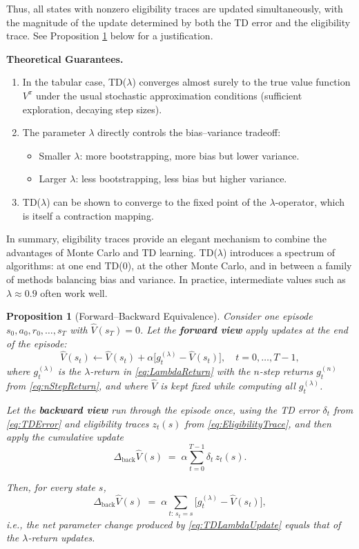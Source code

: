 \documentclass[
]{book}
\newtheorem{proposition}{Proposition}[chapter]
\theoremstyle{definition}
\theoremstyle{definition}
\theoremstyle{definition}
\theoremstyle{definition}
\theoremstyle{remark}
\begin{document}
Thus, all states with nonzero eligibility traces are updated simultaneously, with the magnitude of the update determined by both the TD error and the eligibility trace. See Proposition \ref{prp:ForwardBackwardEquivalence} below for a justification.

\textbf{Theoretical Guarantees.}

\begin{enumerate}
\def\labelenumi{\arabic{enumi}.}
\item
  In the tabular case, TD(\(\lambda\)) converges almost surely to the true value function \(V^\pi\) under the usual stochastic approximation conditions (sufficient exploration, decaying step sizes).
\item
  The parameter \(\lambda\) directly controls the bias--variance tradeoff:

  \begin{itemize}
  \item
    Smaller \(\lambda\): more bootstrapping, more bias but lower variance.
  \item
    Larger \(\lambda\): less bootstrapping, less bias but higher variance.
  \end{itemize}
\item
  TD(\(\lambda\)) can be shown to converge to the fixed point of the \(\lambda\)-operator, which is itself a contraction mapping.
\end{enumerate}

In summary, eligibility traces provide an elegant mechanism to combine the advantages of Monte Carlo and TD learning. TD(\(\lambda\)) introduces a spectrum of algorithms: at one end TD(0), at the other Monte Carlo, and in between a family of methods balancing bias and variance. In practice, intermediate values such as \(\lambda \approx 0.9\) often work well.

\begin{proposition}[Forward–Backward Equivalence]
\protect\hypertarget{prp:ForwardBackwardEquivalence}{}\label{prp:ForwardBackwardEquivalence}Consider one episode \(s_0,a_0,r_0,\ldots,s_T\) with \(\hat V(s_T)=0\). Let the \textbf{forward view} apply updates at the end of the episode:
\[
\hat V(s_t) \leftarrow \hat V(s_t) + \alpha \big[g_t^{(\lambda)}-\hat V(s_t)\big],
\quad t=0,\ldots,T-1,
\]
where \(g_t^{(\lambda)}\) is the \(\lambda\)-return in \eqref{eq:LambdaReturn} with the \(n\)-step returns \(g_t^{(n)}\) from \eqref{eq:nStepReturn}, and where \(\hat V\) is kept fixed while computing all \(g_t^{(\lambda)}\).

Let the \textbf{backward view} run through the episode once, using the TD error \(\delta_t\) from \eqref{eq:TDError} and eligibility traces \(z_t(s)\) from \eqref{eq:EligibilityTrace}, and then apply the cumulative update
\[
\Delta_{\text{back}} \hat V(s) \;=\; \alpha \sum_{t=0}^{T-1} \delta_t\, z_t(s).
\]

Then, for every state \(s\),
\[
\Delta_{\text{back}} \hat V(s)
\;=\;
\alpha \sum_{t:\, s_t=s}\big[g_t^{(\lambda)}-\hat V(s_t)\big],
\]
i.e., the net parameter change produced by \eqref{eq:TDLambdaUpdate} equals that of the \(\lambda\)-return updates.
\end{proposition}
\end{document}
